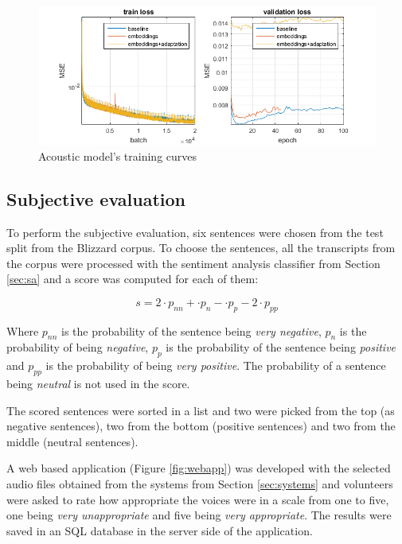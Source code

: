 \begin{figure}[h]
    \centering
    \includegraphics[width=14cm]{figures/aco}
    \caption{Acoustic model's training curves}
\end{figure}

\subsection{Subjective evaluation}

To perform the subjective evaluation, six sentences were chosen from the test split from the Blizzard corpus. To choose the sentences, all the transcripts from the corpus were processed with the sentiment analysis classifier from Section \ref{sec:sa} and a score was computed for each of them:

\begin{equation}
    s = 2 \cdot p_{nn} + \cdot p_{n} - \cdot p_{p} - 2 \cdot p_{pp}
\end{equation}

Where $p_{nn}$ is the probability of the sentence being \textit{very negative}, $p_n$ is the probability of being \textit{negative}, $p_p$ is the probability of the sentence being \textit{positive} and $p_{pp}$ is the probability of being \textit{very positive}. The probability of a sentence being \textit{neutral} is not used in the score.

The scored sentences were sorted in a list and two were picked from the top (as negative sentences), two from the bottom (positive sentences) and two from the middle (neutral sentences).

A web based application (Figure \ref{fig:webapp}) was developed with the selected audio files obtained from the systems from Section \ref{sec:systems} and volunteers were asked to rate how appropriate the voices were in a scale from one to five, one being \textit{very unappropriate} and five being \textit{very appropriate}. The results were saved in an SQL database in the server side of the application.

